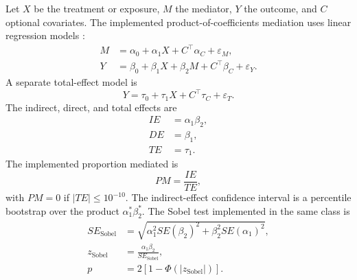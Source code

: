 \documentclass[11pt]{article}
\begin{document}
Let $X$ be the treatment or exposure, $M$ the mediator, $Y$ the outcome, and
$C$ optional covariates. The implemented product-of-coefficients mediation uses
linear regression models \cite{sobel1982,imai2010}:
\begin{align}
M &= \alpha_0+\alpha_1X+C^\top\alpha_C+\varepsilon_M,\\
Y &= \beta_0+\beta_1X+\beta_2M+C^\top\beta_C+\varepsilon_Y.
\end{align}
A separate total-effect model is
\begin{equation}
Y=\tau_0+\tau_1X+C^\top\tau_C+\varepsilon_T.
\end{equation}
The indirect, direct, and total effects are
\begin{align}
IE &= \alpha_1\beta_2,\\
DE &= \beta_1,\\
TE &= \tau_1.
\end{align}
The implemented proportion mediated is
\begin{equation}
PM=\frac{IE}{TE},
\end{equation}
with $PM=0$ if $|TE|\le 10^{-10}$. The indirect-effect confidence interval is a
percentile bootstrap over the product $\alpha_1^\ast\beta_2^\ast$.
The Sobel test implemented in the same class is
\begin{align}
SE_{\mathrm{Sobel}} &=
\sqrt{\alpha_1^2SE(\beta_2)^2+\beta_2^2SE(\alpha_1)^2},\\
z_{\mathrm{Sobel}} &= \frac{\alpha_1\beta_2}{SE_{\mathrm{Sobel}}},\\
p &= 2\left[1-\Phi(|z_{\mathrm{Sobel}}|)\right].
\end{align}
\end{document}
